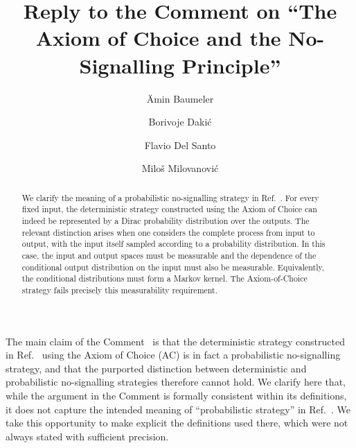 \documentclass[aps,prl,twocolumn,superscriptaddress]{revtex4-2}
\begin{document}
\title{Reply to the Comment on ``The Axiom of Choice and the No-Signalling Principle''}

\author{Ämin Baumeler}

\author{Borivoje Daki\'c}

\author{Flavio Del Santo}
\author{Milo\v s Milovanovi\' c}
\begin{abstract}
We clarify the meaning of a probabilistic no-signalling strategy
in Ref.~\cite{baumeler2025axiom}. For every fixed input, the
deterministic strategy constructed using the Axiom of Choice can
indeed be represented by a Dirac probability distribution over
the outputs. The relevant distinction arises when one considers
the complete process from input to output, with the input itself
sampled according to a probability distribution. In this case,
the input and output spaces must be measurable and the dependence
of the conditional output distribution on the input must also be
measurable. Equivalently, the conditional distributions must form
a Markov kernel. The Axiom-of-Choice strategy fails precisely this
measurability requirement.
\end{abstract}

\maketitle

The main claim of the Comment~\cite{karvonen2026comment} is that
the deterministic strategy constructed in
Ref.~\cite{baumeler2025axiom} using the Axiom of Choice (AC) is in
fact a probabilistic no-signalling strategy, and that the
purported distinction between deterministic and probabilistic
no-signalling strategies therefore cannot hold. We clarify here
that, while the argument in the Comment is formally consistent
within its definitions, it does not capture the intended meaning
of ``probabilistic strategy'' in
Ref.~\cite{baumeler2025axiom}. We take this opportunity to make
explicit the definitions used there, which were not always stated
with sufficient precision.
\end{document}
